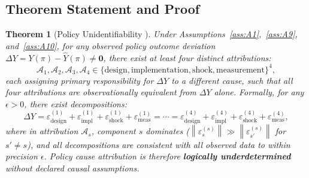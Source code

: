 \documentclass[11pt,a4paper]{article}
\newtheorem{theorem}{Theorem}[section]
\theoremstyle{definition}
\newcommand{\norm}[1]{\left\lVert#1\right\rVert}
\begin{document}
\subsection{Theorem Statement and Proof}
\begin{theorem}[Policy Unidentifiability ]
\label{thm:policy_unident}
Under Assumptions~\ref{ass:A1},~\ref{ass:A9}, and~\ref{ass:A10}, for any observed policy outcome deviation $\Delta Y = Y(\pi) - \hat{Y}(\pi) \neq \mathbf{0}$, there exist at least four distinct attributions:
\begin{equation}
    \mathcal{A}_1, \mathcal{A}_2, \mathcal{A}_3, \mathcal{A}_4 \in \{\text{design}, \text{implementation}, \text{shock}, \text{measurement}\}^4,
    \label{eq:attributions}
\end{equation}
each assigning primary responsibility for $\Delta Y$ to a different cause, such that all four attributions are observationally equivalent from $\Delta Y$ alone. Formally, for any $\epsilon > 0$, there exist decompositions:
\begin{equation}
    \Delta Y = \varepsilon_{\mathrm{design}}^{(1)} + \varepsilon_{\mathrm{impl}}^{(1)} + \varepsilon_{\mathrm{shock}}^{(1)} + \varepsilon_{\mathrm{meas}}^{(1)} = \cdots = \varepsilon_{\mathrm{design}}^{(4)} + \varepsilon_{\mathrm{impl}}^{(4)} + \varepsilon_{\mathrm{shock}}^{(4)} + \varepsilon_{\mathrm{meas}}^{(4)},
    \label{eq:four_decomps}
\end{equation}
where in attribution $\mathcal{A}_s$, component $s$ dominates ($\norm{\varepsilon_s^{(s)}} \gg \norm{\varepsilon_{s'}^{(s)}}$ for $s' \neq s$), and all decompositions are consistent with all observed data to within precision $\epsilon$. Policy cause attribution is therefore \textbf{logically underdetermined} without declared causal assumptions.
\end{theorem}
\end{document}
